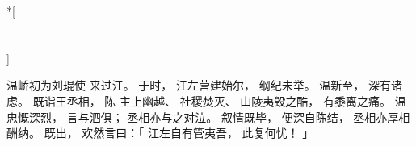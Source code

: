 
\switchcolumn[0]*[\section{}]

温峤初为刘琨使
来过江。
于时，
江左营建始尔，
纲纪未举。
温新至，
深有诸虑。
既诣王丞相，
陈
主上幽越、
社稷焚灭、
山陵夷毁之酷，
有黍离之痛。
温忠慨深烈，
言与泗俱；
丞相亦与之对泣。
叙情既毕，
便深自陈结，
丞相亦厚相酬纳。
既出，
欢然言曰：「
    江左自有管夷吾，
    此复何忧！
」

\switchcolumn




